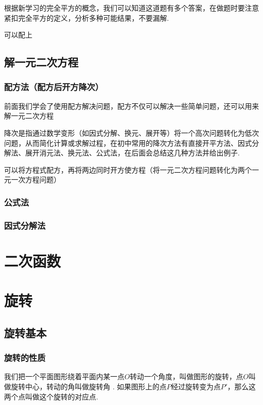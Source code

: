 \documentclass[lang=cn, 10pt, titlestyle=hang]{elegantbook}
\begin{document}
根据新学习的完全平方的概念，我们可以知道这道题有多个答案，在做题时要注意紧扣完全平方的定义，分析多种可能结果，不要漏解.
\begin{solution}
    可以配上
\end{solution}

\section{解一元二次方程}
\subsection{配方法（配方后开方降次）}
前面我们学会了使用配方解决问题，配方不仅可以解决一些简单问题，还可以用来解一元二次方程



降次是指通过数学变形（如因式分解、换元、展开等）将一个高次问题转化为低次问题，从而简化计算或求解过程，在初中常用的降次方法有直接开平方法、因式分解法、展开消元法、换元法、公式法，在后面会总结这几种方法并给出例子.



可以将方程式配方，再将两边同时开方使方程（将一元二次方程问题转化为两个一元一次方程问题）

\subsection{公式法}

\subsection{因式分解法}

\chapter{二次函数}

\chapter{旋转}

\section{旋转基本}

\subsection{旋转的性质}

我们把一个平面图形绕着平面内某一点\(O \)转动一个角度，叫做图形的旋转，点\(O \)叫做旋转中心，转动的角叫做旋转角 . 如果图形上的点\(P \)经过旋转变为点\(P' \)，那么这两个点叫做这个旋转的对应点.
\end{document}
